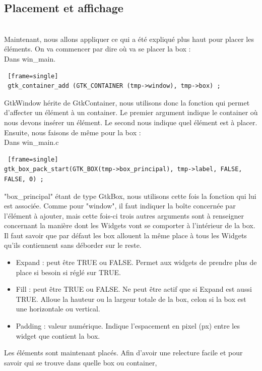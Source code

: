 \documentclass[11pt,french,a4paper]{report}
\begin{document}
    \subsection{Placement et affichage} \\
Maintenant, nous allons appliquer ce qui a été expliqué plus haut pour placer les éléments. On va commencer par dire où 
va se placer la box : \\
\small Dans win\_main. \normalsize
\begin{lstlisting} [frame=single]
 gtk_container_add (GTK_CONTAINER (tmp->window), tmp->box) ; 
\end{lstlisting}
GtkWindow hérite de GtkContainer, nous utilisons donc la fonction qui permet d'affecter un élément à un container. Le premier argument 
indique le container où nous devons insérer un élément. Le second nous indique quel élément est à placer. \\
Ensuite, nous faisons de même pour la box : \\
\small Dans win\_main.c
\begin{lstlisting} [frame=single]
gtk_box_pack_start(GTK_BOX(tmp->box_principal), tmp->label, FALSE, FALSE, 0) ; 
\end{lstlisting}
"box\_principal" étant de type GtkBox, nous utilisons cette fois la fonction qui lui est associée. 
Comme pour "window", il faut indiquer la boîte concernée par l'élément à ajouter, mais cette fois-ci trois autres arguments 
sont à renseigner concernant la manière dont les Widgets vont se comporter à l'intérieur de la box. \\ 
Il faut savoir que par défaut les box allouent la même place à tous les Widgets qu'ils contiennent
sans déborder sur le reste.\\
\begin{itemize}
    \item Expand : peut être TRUE ou FALSE. Permet aux widgets de prendre plus de place si besoin si réglé sur TRUE. 
    \item Fill : peut être TRUE ou FALSE. Ne peut être actif que si Expand est aussi TRUE. Alloue la hauteur ou la largeur totale
        de la box, 
        celon si la box est une horizontale ou vertical.
    \item Padding : valeur numérique. Indique l'espacement en pixel (px) entre les widget que contient la box. 
\end{itemize}
Les éléments sont maintenant placés. Afin d'avoir une relecture facile et pour savoir qui se trouve dans quelle box ou container, 
\end{document}
